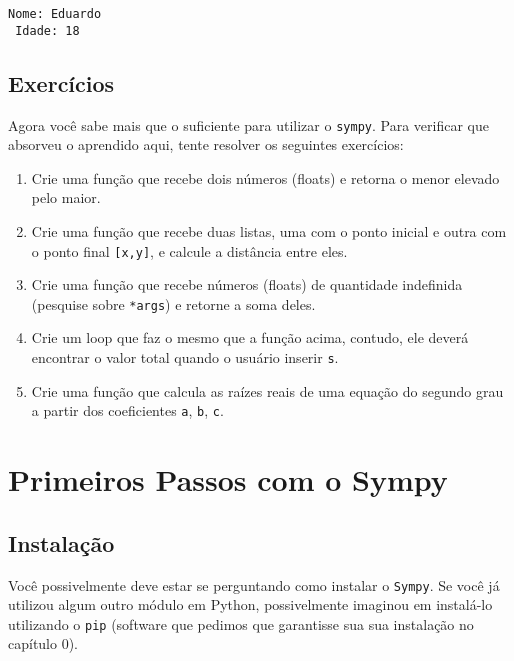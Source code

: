 \documentclass[11pt, brazilian]{article}
\providecommand{\tightlist}{%
      \setlength{\itemsep}{0pt}\setlength{\parskip}{0pt}}
\begin{document}
    \begin{Verbatim}[commandchars=\\\{\}]
 Nome: Eduardo
 Idade: 18
    \end{Verbatim}

    \hypertarget{exercuxedcios}{%
\subsection{Exercícios}\label{exercuxedcios}}

Agora você sabe mais que o suficiente para utilizar o \texttt{sympy}.
Para verificar que absorveu o aprendido aqui, tente resolver os
seguintes exercícios:

\begin{enumerate}
\def\labelenumi{\arabic{enumi}.}
\tightlist
\item
  Crie uma função que recebe dois números (floats) e retorna o menor
  elevado pelo maior.
\item
  Crie uma função que recebe duas listas, uma com o ponto inicial e
  outra com o ponto final \texttt{{[}x,y{]}}, e calcule a distância
  entre eles.
\item
  Crie uma função que recebe números (floats) de quantidade indefinida
  (pesquise sobre \texttt{*args}) e retorne a soma deles.
\item
  Crie um loop que faz o mesmo que a função acima, contudo, ele deverá
  encontrar o valor total quando o usuário inserir
  \texttt{\textquotesingle{}s\textquotesingle{}}.
\item
  Crie uma função que calcula as raízes reais de uma equação do segundo
  grau a partir dos coeficientes \texttt{a}, \texttt{b}, \texttt{c}.
\end{enumerate}

    \hypertarget{primeiros-passos-com-o-sympy}{%
\section{Primeiros Passos com o
Sympy}\label{primeiros-passos-com-o-sympy}}

\hypertarget{instalauxe7uxe3o}{%
\subsection{Instalação}\label{instalauxe7uxe3o}}

Você possivelmente deve estar se perguntando como instalar o
\texttt{Sympy}. Se você já utilizou algum outro módulo em Python,
possivelmente imaginou em instalá-lo utilizando o \texttt{pip} (software
que pedimos que garantisse sua sua instalação no capítulo 0).
\end{document}
